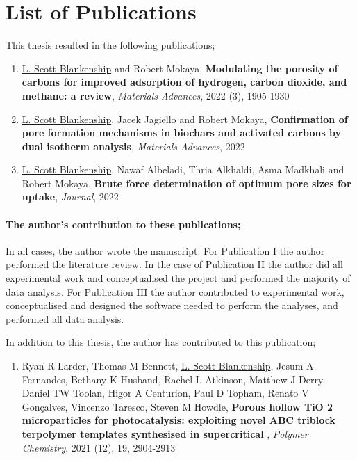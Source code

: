 \cleardoublepage
{}

\chapter*{List of Publications}

This thesis resulted in the following publications;

\begin{enumerate}[label=\Roman*]
    \item \underline{L. Scott Blankenship} and Robert Mokaya, \textbf{Modulating the porosity of carbons for improved adsorption of hydrogen, carbon dioxide, and methane: a review}, \textit{Materials Advances}, 2022 (3), 1905-1930
    \item \underline{L. Scott Blankenship}, Jacek Jagiello and Robert Mokaya, \textbf{Confirmation of pore formation mechanisms in biochars and activated carbons by dual isotherm analysis}, \textit{Materials Advances}, 2022
    \item \underline{L. Scott Blankenship}, Nawaf Albeladi, Thria Alkhaldi, Asma Madkhali and Robert Mokaya, \textbf{Brute force determination of optimum pore sizes for  uptake}, \textit{Journal}, 2022
    
\end{enumerate}

\subsubsection*{The author's contribution to these publications;}

In all cases, the author wrote the manuscript. For Publication I the author performed the literature review. In the case of Publication II the author did all experimental work and conceptualised the project and performed the majority of data analysis. For Publication III the author contributed to experimental work, conceptualised and designed the software needed to perform the analyses, and performed all data analysis.

In addition to this thesis, the author has contributed to this publication;

\begin{enumerate}[resume, label=\Roman*]
    \item Ryan R Larder, Thomas M Bennett, \underline{L. Scott Blankenship}, Jesum A Fernandes, Bethany K Husband, Rachel L Atkinson, Matthew J Derry, Daniel TW Toolan, Higor A Centurion, Paul D Topham, Renato V Gonçalves, Vincenzo Taresco, Steven M Howdle, \textbf{Porous hollow TiO 2 microparticles for photocatalysis: exploiting novel ABC triblock terpolymer templates synthesised in supercritical }, \textit{Polymer Chemistry}, 2021 (12), 19, 2904-2913
    
\end{enumerate}

